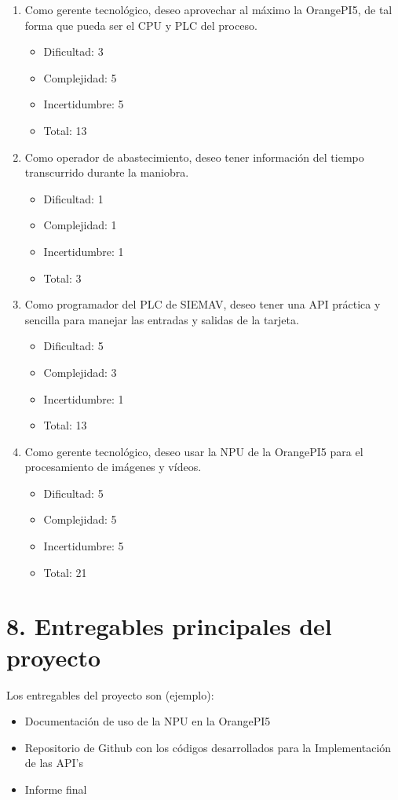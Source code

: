 \documentclass[
11pt, %
]{charter}
\begin{document}
\begin{enumerate}
	\item Como gerente tecnológico, deseo aprovechar al máximo la OrangePI5, de tal forma que pueda ser el CPU y PLC del proceso.
		\begin{itemize}
			\item Dificultad: 3
			\item Complejidad: 5
			\item Incertidumbre: 5
			\item Total: 13
		\end{itemize}
	\item Como operador de abastecimiento, deseo tener información del tiempo transcurrido durante la maniobra.
		\begin{itemize}
			\item Dificultad: 1
			\item Complejidad: 1
			\item Incertidumbre: 1
			\item Total: 3
		\end{itemize}	
	\item Como programador del PLC de SIEMAV, deseo tener una API práctica y sencilla para manejar las entradas y salidas de la tarjeta.
		\begin{itemize}
			\item Dificultad: 5
			\item Complejidad: 3
			\item Incertidumbre: 1
			\item Total: 13 
		\end{itemize}	
	\item Como gerente tecnológico, deseo usar la NPU de la OrangePI5 para el procesamiento de imágenes y vídeos.
		\begin{itemize}
			\item Dificultad: 5
			\item Complejidad: 5
			\item Incertidumbre: 5
			\item Total: 21
		\end{itemize}
\end{enumerate}
\section{8. Entregables principales del proyecto}
\label{sec:entregables}


Los entregables del proyecto son (ejemplo):

\begin{itemize}
	\item Documentación de uso de la NPU en la OrangePI5
	\item Repositorio de Github con los códigos desarrollados para la Implementación de las API's
	\item Informe final
\end{itemize}
\end{document}
